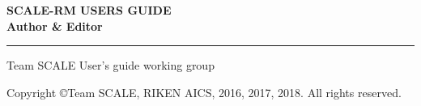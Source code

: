 \newpage
\thispagestyle{empty}

\vspace{10mm}
{\large{\bf SCALE-RM USERS GUIDE}}\\


\vspace{10mm}
{\large{\bf Author \& Editor}}\\
\hrule width 90mm
\begin{tabbing}
Team SCALE User's guide working group\\
\end{tabbing}


\vspace{110mm}
\begin{flushright}

\vspace{10mm}
Copyright \copyright Team SCALE, RIKEN AICS, 2016, 2017, 2018. All rights reserved.
\end{flushright}

